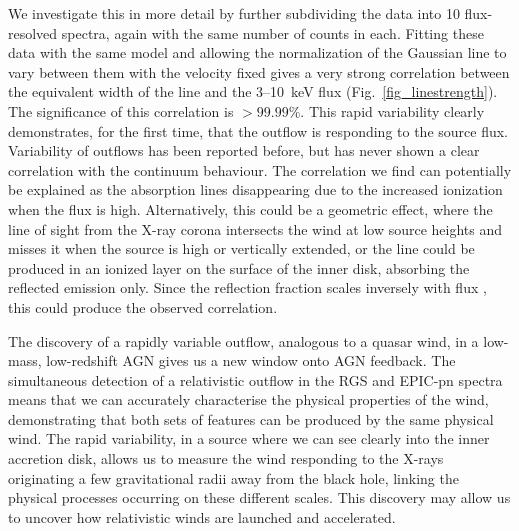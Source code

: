 \documentclass[10pt, a4paper]{article}
\begin{document}
We investigate this in more detail by further subdividing the data into 10 flux-resolved spectra, again with the same number of counts in each. Fitting these data with the same model and allowing the normalization of the Gaussian line to vary between them with the velocity fixed gives a very strong correlation between the equivalent width of the line and the 3--10~keV flux (Fig.~\ref{fig_linestrength}). The significance of this correlation is $>99.99$\%. This rapid variability clearly demonstrates, for the first time, that the outflow is responding to the source flux.
Variability of outflows has been reported before\cite{Cappi09}, but has never shown a clear correlation with the continuum behaviour. The correlation we find can potentially be explained as the absorption lines disappearing due to the increased ionization when the flux is high. Alternatively, this could be a geometric effect, where the line of sight from the X-ray corona intersects the wind at low source heights and misses it when the source is high or vertically extended, or the line could be produced in an ionized layer on the surface of the inner disk, absorbing the reflected emission only\cite{Gallo11}. Since the reflection fraction scales inversely with flux \cite{Chiang15}, this could produce the observed correlation.





The discovery of a rapidly variable outflow, analogous to a quasar wind, in a low-mass, low-redshift AGN gives us a new window onto AGN feedback. The simultaneous detection of a relativistic outflow in the RGS and EPIC-pn spectra means that we can accurately characterise the physical properties of the wind, demonstrating that both sets of features can be produced by the same physical wind. The rapid variability, in a source where we can see clearly into the inner accretion disk, allows us to measure the wind responding to the X-rays originating a few gravitational radii away from the black hole, linking the physical processes occurring on these different scales. This discovery may allow us to uncover how relativistic winds are launched and accelerated.

\end{document}
